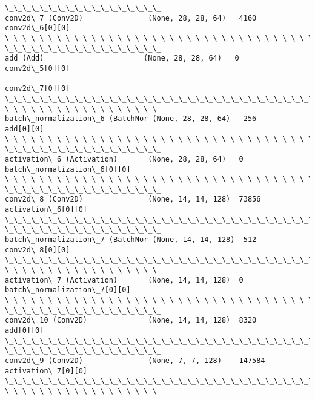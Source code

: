 \documentclass[11pt]{article}
\begin{document}
\begin{Verbatim}[commandchars=\\\{\}]
\_\_\_\_\_\_\_\_\_\_\_\_\_\_\_\_\_\_
conv2d\_7 (Conv2D)               (None, 28, 28, 64)   4160        conv2d\_6[0][0]
\_\_\_\_\_\_\_\_\_\_\_\_\_\_\_\_\_\_\_\_\_\_\_\_\_\_\_\_\_\_\_\_\_\_\_\_\_\_\_\_\_\_\_\_\_\_\_\_\_\_\_\_\_\_\_\_\_\_\_\_\_\_\_\_\_\_\_\_\_\_\_\_\_\_\_\_\_\_\_\_
\_\_\_\_\_\_\_\_\_\_\_\_\_\_\_\_\_\_
add (Add)                       (None, 28, 28, 64)   0           conv2d\_5[0][0]
                                                                 conv2d\_7[0][0]
\_\_\_\_\_\_\_\_\_\_\_\_\_\_\_\_\_\_\_\_\_\_\_\_\_\_\_\_\_\_\_\_\_\_\_\_\_\_\_\_\_\_\_\_\_\_\_\_\_\_\_\_\_\_\_\_\_\_\_\_\_\_\_\_\_\_\_\_\_\_\_\_\_\_\_\_\_\_\_\_
\_\_\_\_\_\_\_\_\_\_\_\_\_\_\_\_\_\_
batch\_normalization\_6 (BatchNor (None, 28, 28, 64)   256         add[0][0]
\_\_\_\_\_\_\_\_\_\_\_\_\_\_\_\_\_\_\_\_\_\_\_\_\_\_\_\_\_\_\_\_\_\_\_\_\_\_\_\_\_\_\_\_\_\_\_\_\_\_\_\_\_\_\_\_\_\_\_\_\_\_\_\_\_\_\_\_\_\_\_\_\_\_\_\_\_\_\_\_
\_\_\_\_\_\_\_\_\_\_\_\_\_\_\_\_\_\_
activation\_6 (Activation)       (None, 28, 28, 64)   0
batch\_normalization\_6[0][0]
\_\_\_\_\_\_\_\_\_\_\_\_\_\_\_\_\_\_\_\_\_\_\_\_\_\_\_\_\_\_\_\_\_\_\_\_\_\_\_\_\_\_\_\_\_\_\_\_\_\_\_\_\_\_\_\_\_\_\_\_\_\_\_\_\_\_\_\_\_\_\_\_\_\_\_\_\_\_\_\_
\_\_\_\_\_\_\_\_\_\_\_\_\_\_\_\_\_\_
conv2d\_8 (Conv2D)               (None, 14, 14, 128)  73856
activation\_6[0][0]
\_\_\_\_\_\_\_\_\_\_\_\_\_\_\_\_\_\_\_\_\_\_\_\_\_\_\_\_\_\_\_\_\_\_\_\_\_\_\_\_\_\_\_\_\_\_\_\_\_\_\_\_\_\_\_\_\_\_\_\_\_\_\_\_\_\_\_\_\_\_\_\_\_\_\_\_\_\_\_\_
\_\_\_\_\_\_\_\_\_\_\_\_\_\_\_\_\_\_
batch\_normalization\_7 (BatchNor (None, 14, 14, 128)  512         conv2d\_8[0][0]
\_\_\_\_\_\_\_\_\_\_\_\_\_\_\_\_\_\_\_\_\_\_\_\_\_\_\_\_\_\_\_\_\_\_\_\_\_\_\_\_\_\_\_\_\_\_\_\_\_\_\_\_\_\_\_\_\_\_\_\_\_\_\_\_\_\_\_\_\_\_\_\_\_\_\_\_\_\_\_\_
\_\_\_\_\_\_\_\_\_\_\_\_\_\_\_\_\_\_
activation\_7 (Activation)       (None, 14, 14, 128)  0
batch\_normalization\_7[0][0]
\_\_\_\_\_\_\_\_\_\_\_\_\_\_\_\_\_\_\_\_\_\_\_\_\_\_\_\_\_\_\_\_\_\_\_\_\_\_\_\_\_\_\_\_\_\_\_\_\_\_\_\_\_\_\_\_\_\_\_\_\_\_\_\_\_\_\_\_\_\_\_\_\_\_\_\_\_\_\_\_
\_\_\_\_\_\_\_\_\_\_\_\_\_\_\_\_\_\_
conv2d\_10 (Conv2D)              (None, 14, 14, 128)  8320        add[0][0]
\_\_\_\_\_\_\_\_\_\_\_\_\_\_\_\_\_\_\_\_\_\_\_\_\_\_\_\_\_\_\_\_\_\_\_\_\_\_\_\_\_\_\_\_\_\_\_\_\_\_\_\_\_\_\_\_\_\_\_\_\_\_\_\_\_\_\_\_\_\_\_\_\_\_\_\_\_\_\_\_
\_\_\_\_\_\_\_\_\_\_\_\_\_\_\_\_\_\_
conv2d\_9 (Conv2D)               (None, 7, 7, 128)    147584
activation\_7[0][0]
\_\_\_\_\_\_\_\_\_\_\_\_\_\_\_\_\_\_\_\_\_\_\_\_\_\_\_\_\_\_\_\_\_\_\_\_\_\_\_\_\_\_\_\_\_\_\_\_\_\_\_\_\_\_\_\_\_\_\_\_\_\_\_\_\_\_\_\_\_\_\_\_\_\_\_\_\_\_\_\_
\_\_\_\_\_\_\_\_\_\_\_\_\_\_\_\_\_\_

\end{Verbatim}
\end{document}
